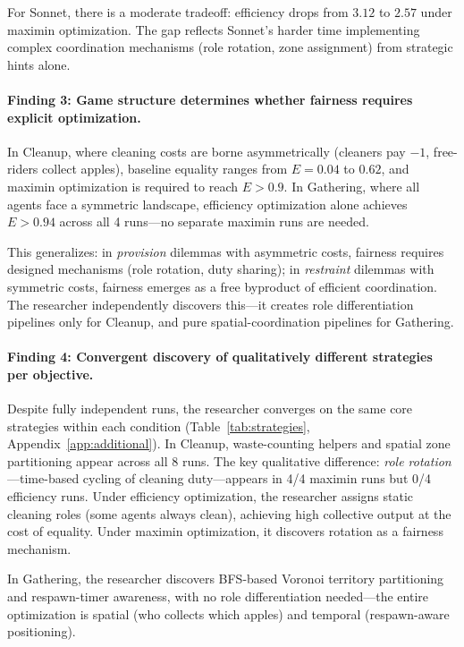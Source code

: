 \documentclass[sigconf,authordraft]{acmart}
\begin{document}
For Sonnet, there is a moderate tradeoff: efficiency drops from $3.12$ to $2.57$ under maximin optimization. The gap reflects Sonnet's harder time implementing complex coordination mechanisms (role rotation, zone assignment) from strategic hints alone.

\paragraph{Finding 3: Game structure determines whether fairness requires explicit optimization.}
In Cleanup, where cleaning costs are borne asymmetrically (cleaners pay $-1$, free-riders collect apples), baseline equality ranges from $E{=}0.04$ to $0.62$, and maximin optimization is required to reach $E > 0.9$. In Gathering, where all agents face a symmetric landscape, efficiency optimization alone achieves $E > 0.94$ across all 4 runs---no separate maximin runs are needed.

This generalizes: in \emph{provision} dilemmas with asymmetric costs, fairness requires designed mechanisms (role rotation, duty sharing); in \emph{restraint} dilemmas with symmetric costs, fairness emerges as a free byproduct of efficient coordination. The researcher independently discovers this---it creates role differentiation pipelines only for Cleanup, and pure spatial-coordination pipelines for Gathering.

\paragraph{Finding 4: Convergent discovery of qualitatively different strategies per objective.}
Despite fully independent runs, the researcher converges on the same core strategies within each condition (Table~\ref{tab:strategies}, Appendix~\ref{app:additional}). In Cleanup, waste-counting helpers and spatial zone partitioning appear across all 8 runs. The key qualitative difference: \emph{role rotation}---time-based cycling of cleaning duty---appears in 4/4 maximin runs but 0/4 efficiency runs. Under efficiency optimization, the researcher assigns static cleaning roles (some agents always clean), achieving high collective output at the cost of equality. Under maximin optimization, it discovers rotation as a fairness mechanism.

In Gathering, the researcher discovers BFS-based Voronoi territory partitioning and respawn-timer awareness, with no role differentiation needed---the entire optimization is spatial (who collects which apples) and temporal (respawn-aware positioning).
\end{document}
